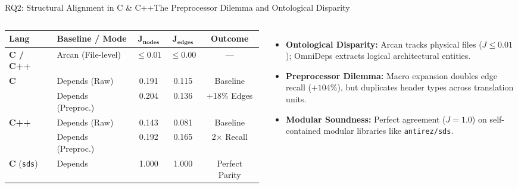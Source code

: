 \documentclass[aspectratio=169,10pt]{beamer}
\begin{document}
\begin{frame}{RQ2: Structural Alignment in C \& C++}{The Preprocessor Dilemma and Ontological Disparity}
  \begin{columns}[T,onlytextwidth]
      \par\vspace{0.15em}
      {\scriptsize\setlength{\tabcolsep}{1.5pt}
      \begin{tabular*}{\linewidth}{@{\extracolsep{\fill}}llccc@{}}
        \toprule
        \textbf{Lang} & \textbf{Baseline / Mode} & $\mathbf{J_{\text{nodes}}}$ & $\mathbf{J_{\text{edges}}}$ & \textbf{Outcome} \\
        \midrule
        \textbf{C / C++}& Arcan (File-level) & $\le 0.01$ & $\le 0.00$ & --- \\
        \midrule
        \textbf{C}   & Depends (Raw)       & 0.191 & 0.115 & Baseline \\
                     & Depends (Preproc.)  & 0.204 & 0.136 & +18\% Edges \\
        \midrule
        \textbf{C++} & Depends (Raw)       & 0.143 & 0.081 & Baseline \\
                     & Depends (Preproc.)  & 0.192 & 0.165 & 2$\times$ Recall \\
        \midrule
        \textbf{C} (\texttt{sds}) & Depends & 1.000 & 1.000 & Perfect Parity \\
        \bottomrule
      \end{tabular*}}\par
      \vspace{0.5em}

      \par\vspace{0.15em}
      {\scriptsize
      \begin{itemize}\setlength{\itemsep}{0.25em}
        \item \textbf{Ontological Disparity:} Arcan tracks physical files ($J \le 0.01$); OmniDeps extracts logical architectural entities.\par
        \item \textbf{Preprocessor Dilemma:} Macro expansion doubles edge recall ($+104\%$), but duplicates header types across translation units.\par
        \item \textbf{Modular Soundness:} Perfect agreement ($J = 1.0$) on self-contained modular libraries like \texttt{antirez/sds}.\par
      \end{itemize}\par}
      \vspace{0.35em}


\end{columns}
\end{frame}
\end{document}
